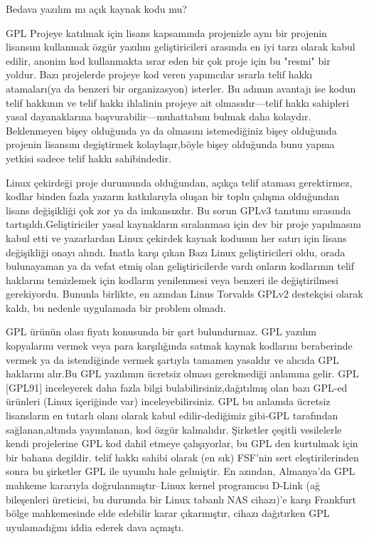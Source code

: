 \begin{section}{Bedava yazılım mı açık kaynak kodu mu?}
\begin{subsection}{GPL}
Projeye katılmak için  lisans kapsamında projenizle aynı bir projenin lisansını kullanmak özgür yazılım geliştiricileri arasında en iyi tarzı olarak kabul edilir, anonim kod  kullanmakta ısrar eden  bir çok proje için bu  "resmi" bir yoldur. Bazı projelerde projeye kod veren yapımcılar ısrarla telif hakkı atamaları(ya da benzeri bir organizasyon) isterler. Bu adımın avantajı ise kodun telif hakkının ve telif hakkı ihlalinin projeye ait olmasıdır—telif hakkı sahipleri yasal dayanaklarına başvurabilir—muhattabını bulmak daha kolaydır. Beklenmeyen bişey olduğunda ya da olmasını istemediğiniz bişey olduğunda projenin lisansını degiştirmek kolaylaşır,böyle bişey olduğunda bunu yapma yetkisi sadece telif hakkı sahibindedir.

Linux çekirdeği proje durumunda olduğundan, açıkça telif ataması gerektirmez, kodlar binden fazla yazarın katkılarıyla oluşan bir toplu çalışma  olduğundan lisans değişikliği çok zor ya da imkansızdır. Bu sorun GPLv3 tanıtımı sırasında tartışıldı.Geliştiriciler yasal kaynakların sıralanması için dev bir proje yapılmasını kabul etti ve yazarlardan Linux çekirdek kaynak kodunun her satırı için lisans değişikliği onayı alındı. Inatla karşı çıkan Bazı Linux geliştiricileri oldu, orada bulunayaman ya da vefat etmiş olan geliştiricilerde vardı onların kodlarının telif haklarını temizlemek için kodların yenilenmesi veya benzeri ile değiştirilmesi gerekiyordu. Bununla birlikte, en azından Linus Torvalds GPLv2  destekçisi olarak kaldı, bu nedenle uygulamada bir problem olmadı.

GPL ürünün olası fiyatı konusunda bir şart bulundurmaz. GPL yazılım kopyalarını vermek veya para karşılığında satmak kaynak kodlarını beraberinde vermek ya da istendiğinde vermek şartıyla tamamen yasaldır ve alıcıda GPL haklarını alır.Bu GPL yazılımın ücretsiz olması gerekmediği anlamına gelir. GPL [GPL91] inceleyerek daha fazla bilgi bulabilirsiniz,dağıtılmış olan bazı  GPL-ed ürünleri (Linux içeriğinde var) inceleyebilirsiniz. GPL  bu anlamda ücretsiz lisansların en tutarlı olanı olarak kabul edilir-dediğimiz gibi-GPL tarafından sağlanan,altında yayımlanan, kod  özgür kalmalıdır. Şirketler çeşitli vesilelerle kendi projelerine GPL kod dahil etmeye çalışıyorlar, bu GPL den kurtulmak için bir bahana degildir. telif hakkı sahibi olarak (en sık) FSF'nin sert eleştirilerinden sonra bu şirketler GPL ile uyumlu hale gelmiştir. En azından, Almanya'da GPL mahkeme kararıyla doğrulanmıştır--Linux kernel programcısı D-Link (ağ bileşenleri üreticisi, bu durumda bir Linux tabanlı NAS cihazı)'e karşı Frankfurt bölge mahkemesinde elde edebilir karar çıkarmıştır, cihazı dağıtırken GPL uyulamadığını iddia ederek dava açmıştı.


\end{subsection}
\end{section}
